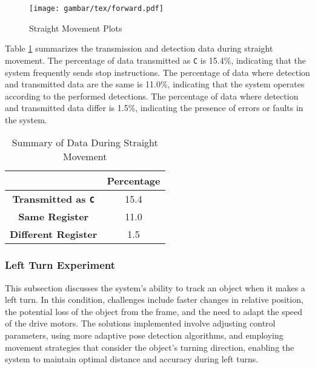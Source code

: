 \begin{figure}[H]
    \centering
    \texttt{[image: gambar/tex/forward.pdf]}
    \caption{Straight Movement Plots}
    \label{fig:straight_movement_plots}
\end{figure}

Table \ref{tab:straight_movement_data_transmission_detection} summarizes the transmission and detection data during straight movement. The percentage of data transmitted as \texttt{C} is 15.4\%, indicating that the system frequently sends stop instructions. The percentage of data where detection and transmitted data are the same is 11.0\%, indicating that the system operates according to the performed detections. The percentage of data where detection and transmitted data differ is 1.5\%, indicating the presence of errors or faults in the system.

\begin{table}[H]
    \centering
    \caption{Summary of Data During Straight Movement}
    \label{tab:straight_movement_data_transmission_detection}
    \begin{tabular}{|c|c|}
        \hline 
        \cellcolor[HTML]{000000} & \cellcolor[HTML]{C0C0C0} \textbf{Percentage}   \\ \hline
        \cellcolor[HTML]{C0C0C0} \textbf{Transmitted as \texttt{C}} & 15.4  \\ \hline
        \cellcolor[HTML]{C0C0C0} \textbf{Same Register}  & 11.0  \\ \hline
        \cellcolor[HTML]{C0C0C0} \textbf{Different Register}   & 1.5  \\ \hline
    \end{tabular}
\end{table}

\vspace{5pt}
\subsubsection{Left Turn Experiment}
\label{subsubsec:leftturnexperiment}

This subsection discusses the system's ability to track an object when it makes a left turn. In this condition, challenges include faster changes in relative position, the potential loss of the object from the frame, and the need to adapt the speed of the drive motors. The solutions implemented involve adjusting control parameters, using more adaptive pose detection algorithms, and employing movement strategies that consider the object's turning direction, enabling the system to maintain optimal distance and accuracy during left turns.

